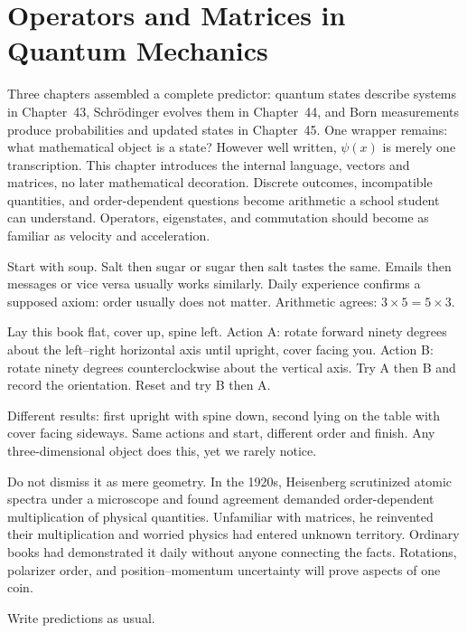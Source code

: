 \chapter{Operators and Matrices in Quantum Mechanics}

Three chapters assembled a complete predictor: quantum states describe systems in Chapter~43, Schrödinger evolves them in Chapter~44, and Born measurements produce probabilities and updated states in Chapter~45. One wrapper remains: what mathematical object is a state? However well written, $\psi(x)$ is merely one transcription. This chapter introduces the internal language, vectors and matrices, no later mathematical decoration. Discrete outcomes, incompatible quantities, and order-dependent questions become arithmetic a school student can understand. Operators, eigenstates, and commutation should become as familiar as velocity and acceleration.


Start with soup. Salt then sugar or sugar then salt tastes the same. Emails then messages or vice versa usually works similarly. Daily experience confirms a supposed axiom: order usually does not matter. Arithmetic agrees: $3\times5=5\times3$.

Lay this book flat, cover up, spine left. Action A: rotate forward ninety degrees about the left--right horizontal axis until upright, cover facing you. Action B: rotate ninety degrees counterclockwise about the vertical axis. Try A then B and record the orientation. Reset and try B then A.

Different results: first upright with spine down, second lying on the table with cover facing sideways. Same actions and start, different order and finish. Any three-dimensional object does this, yet we rarely notice.

Do not dismiss it as mere geometry. In the 1920s, Heisenberg scrutinized atomic spectra under a microscope and found agreement demanded order-dependent multiplication of physical quantities. Unfamiliar with matrices, he reinvented their multiplication and worried physics had entered unknown territory. Ordinary books had demonstrated it daily without anyone connecting the facts. Rotations, polarizer order, and position--momentum uncertainty will prove aspects of one coin.


Write predictions as usual.

